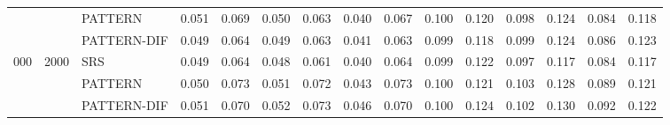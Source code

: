 {\begin{tabular}{rrl rr rr rr rr rr rr }
 &  & PATTERN & 0.051 & 0.069 & 0.050 & 0.063 & 0.040 & 0.067 & 0.100 & 0.120 & 0.098 & 0.124 & 0.084 & 0.118 \\
 &  & PATTERN-DIF & 0.049 & 0.064 & 0.049 & 0.063 & 0.041 & 0.063 & 0.099 & 0.118 & 0.099 & 0.124 & 0.086 & 0.123 \\
\addlinespace
8{,}000 & 2000 & SRS & 0.049 & 0.064 & 0.048 & 0.061 & 0.040 & 0.064 & 0.099 & 0.122 & 0.097 & 0.117 & 0.084 & 0.117 \\
 &  & PATTERN & 0.050 & 0.073 & 0.051 & 0.072 & 0.043 & 0.073 & 0.100 & 0.121 & 0.103 & 0.128 & 0.089 & 0.121 \\
 &  & PATTERN-DIF & 0.051 & 0.070 & 0.052 & 0.073 & 0.046 & 0.070 & 0.100 & 0.124 & 0.102 & 0.130 & 0.092 & 0.122 \\
\bottomrule\end{tabular}}
